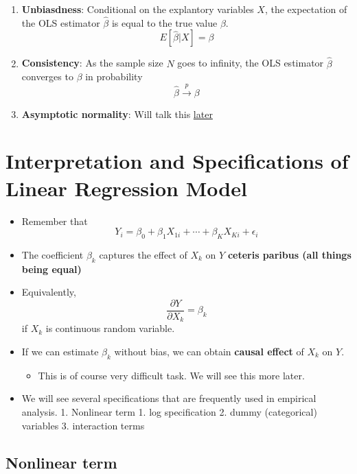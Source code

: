 \documentclass[]{book}
\providecommand{\tightlist}{%
  \setlength{\itemsep}{0pt}\setlength{\parskip}{0pt}}
\begin{document}
\begin{enumerate}
\def\labelenumi{\arabic{enumi}.}
\tightlist
\item
  \textbf{Unbiasdness}: Conditional on the explantory variables \(X\),
  the expectation of the OLS estimator \(\hat{\beta}\) is equal to the
  true value \(\beta\). \[
  E[\hat{\beta} | X] = \beta
  \]
\item
  \textbf{Consistency}: As the sample size \(N\) goes to infinity, the
  OLS estimator \(\hat{\beta}\) converges to \(\beta\) in probability \[
  \hat{\beta}\overset{p}{\longrightarrow}\beta
  \]
\item
  \textbf{Asymptotic normality}: Will talk this
  \protect\hyperlink{Statistical-Inference}{later}
\end{enumerate}

\section{Interpretation and Specifications of Linear Regression
Model}\label{interpretation-and-specifications-of-linear-regression-model}

\begin{itemize}
\tightlist
\item
  Remember that \[ 
  Y_{i}=\beta_{0}+\beta_{1}X_{1i}+\cdots+\beta_{K}X_{Ki}+\epsilon_{i} 
  \]
\item
  The coefficient \(\beta_k\) captures the effect of \(X_k\) on \(Y\)
  \textbf{ceteris paribus (all things being equal)}
\item
  Equivalently, \[
  \frac{\partial Y}{\partial X_k} = \beta_k 
      \] if \(X_k\) is continuous random variable.
\item
  If we can estimate \(\beta_k\) without bias, we can obtain
  \textbf{causal effect} of \(X_k\) on \(Y\).

  \begin{itemize}
  \tightlist
  \item
    This is of course very difficult task. We will see this more later.
  \end{itemize}
\item
  We will see several specifications that are frequently used in
  empirical analysis. 1. Nonlinear term 1. log specification 2. dummy
  (categorical) variables 3. interaction terms
\end{itemize}

\subsection{Nonlinear term}\label{nonlinear-term}
\end{document}
